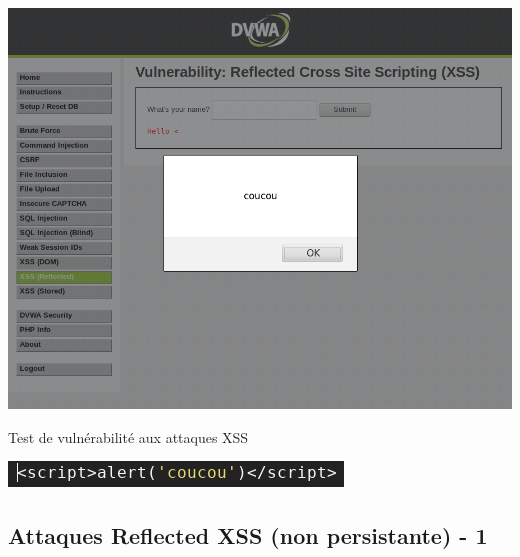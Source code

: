 \documentclass[8pt]{beamer}
\begin{document}
\begin{frame}

\begin{center}
	\includegraphics[scale=.25]{../images/xss/hack2.png}
\end{center}

\begin{block}{Test de vulnérabilité aux attaques XSS}
\begin{center}
	\includegraphics[scale=.40]{../images/xss/script.png}
\end{center}

\end{block}

\end{frame}


\subsection{Attaques Reflected XSS (non persistante) - 1}
\end{document}
